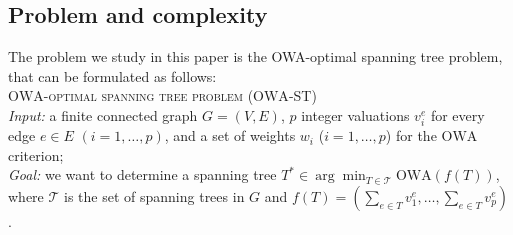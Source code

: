 \documentclass[final,3p,times]{elsarticle}
\newcommand{\owa}{\mbox{OWA}}
\begin{document}
\begin{itemize}
\end{itemize}

\subsection{Problem and complexity}

The problem we study in this paper is the OWA-optimal spanning tree problem, that can be formulated as follows:\\ [1ex]
\textsc{$\owa$-optimal spanning tree problem ($\owa$-ST)}\\
\emph{Input: } a finite connected graph $G = (V,E)$, $p$ integer valuations $v_i^e$ for every edge $e \in E$ $(i=1,\ldots,p)$, and a set of weights $w_i$ ($i=1,\ldots,p$) for the $\owa$ criterion;\\
\emph{Goal: } we want to determine a spanning tree $T^* \in ~\mbox{arg}\;\min_{T \in {\mathcal T}}\owa(f(T))$, where ${\mathcal T}$ is the set of spanning trees in $G$ and $f(T) = (\sum_{e \in T} v_1^e,\ldots,\sum_{e \in T} v_p^e)$. \\[-1.5ex] 
\end{document}
